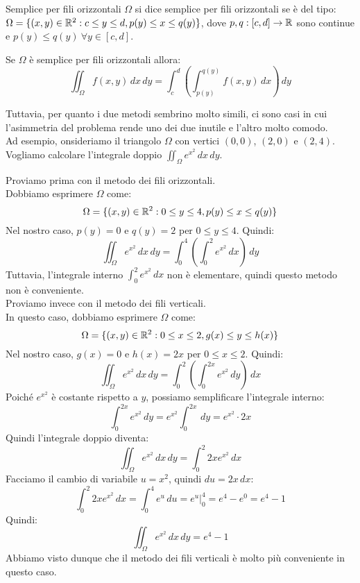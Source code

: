 \begin{definizione}{Semplice per fili orizzontali}
  $\Omega$ si dice semplice per fili orizzontali se è del tipo: $\Omega = \{ (x,y) \in \mathbb{R}^2 : c \leq y \leq d, p(y) \leq x \leq q(y) \}$, dove $p,q:[c,d] \rightarrow \mathbb{R}$ sono continue e $p(y) \leq q(y) \ \forall y \in [c,d]$.
\end{definizione}

Se $\Omega$ è semplice per fili orizzontali allora:
\[
\iint_{\Omega} f(x,y) \, dx \, dy = \int_{c}^{d} \left( \int_{p(y)}^{q(y)} f(x,y) \, dx \right) \, dy
\]

Tuttavia, per quanto i due metodi sembrino molto simili, ci sono casi in cui l'asimmetria del problema rende uno dei due inutile e l'altro molto comodo.\\


Ad esempio, onsideriamo il triangolo $\Omega$ con vertici $(0,0)$, $(2,0)$ e $(2,4)$. Vogliamo calcolare l'integrale doppio $\iint_{\Omega} e^{x^2} \, dx \, dy$.

Proviamo prima con il metodo dei fili orizzontali.\\
Dobbiamo esprimere $\Omega$ come:
\[
\Omega = \{ (x,y) \in \mathbb{R}^2 : 0 \leq y \leq 4, p(y) \leq x \leq q(y) \}
\]
Nel nostro caso, $p(y) = 0$ e $q(y) = 2$ per $0 \leq y \leq 4$. Quindi:
\[
\iint_{\Omega} e^{x^2} \, dx \, dy = \int_{0}^{4} \left( \int_{0}^{2} e^{x^2} \, dx \right) \, dy
\]
Tuttavia, l'integrale interno $\int_{0}^{2} e^{x^2} \, dx$ non è elementare, quindi questo metodo non è conveniente.\\

Proviamo invece con il metodo dei fili verticali.\\
In questo caso, dobbiamo esprimere $\Omega$ come:
\[
\Omega = \{ (x,y) \in \mathbb{R}^2 : 0 \leq x \leq 2, g(x) \leq y \leq h(x) \}
\]
Nel nostro caso, $g(x) = 0$ e $h(x) = 2x$ per $0 \leq x \leq 2$. Quindi:
\[
\iint_{\Omega} e^{x^2} \, dx \, dy = \int_{0}^{2} \left( \int_{0}^{2x} e^{x^2} \, dy \right) \, dx
\]
Poiché $e^{x^2}$ è costante rispetto a $y$, possiamo semplificare l'integrale interno:
\[
\int_{0}^{2x} e^{x^2} \, dy = e^{x^2} \int_{0}^{2x} \, dy = e^{x^2} \cdot 2x
\]
Quindi l'integrale doppio diventa:
\[
\iint_{\Omega} e^{x^2} \, dx \, dy = \int_{0}^{2} 2x e^{x^2} \, dx
\]
Facciamo il cambio di variabile $u = x^2$, quindi $du = 2x \, dx$:
\[
\int_{0}^{2} 2x e^{x^2} \, dx = \int_{0}^{4} e^u \, du = e^u \bigg|_{0}^{4} = e^4 - e^0 = e^4 - 1
\]
Quindi:
\[
\iint_{\Omega} e^{x^2} \, dx \, dy = e^4 - 1
\]
Abbiamo visto dunque che il metodo dei fili verticali è molto più conveniente in questo caso.

